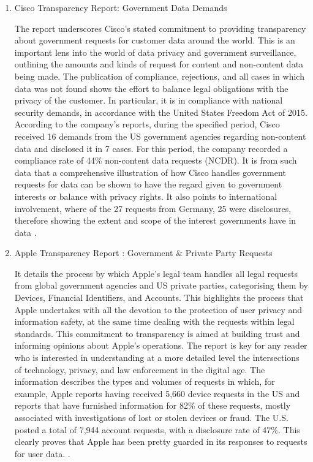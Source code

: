 \begin{enumerate}
 \item Cisco Transparency Report: Government Data Demands 

 The report underscores Cisco's stated commitment to providing transparency about government requests for customer data around the world. This is an important lens into the world of data privacy and government surveillance, outlining the amounts and kinds of request for content and non-content data being made. The publication of compliance, rejections, and all cases in which data was not found shows the effort to balance legal obligations with the privacy of the customer. In particular, it is in compliance with national security demands, in accordance with the United States Freedom Act of 2015. According to the company's reports, during the specified period, Cisco received 16 demands from the US government agencies regarding non-content data and disclosed it in 7 cases. For this period, the company recorded a compliance rate of 44\% non-content data requests (NCDR). It is from such data that a comprehensive illustration of how Cisco handles government requests for data can be shown to have the regard given to government interests or balance with privacy rights. It also points to international involvement, where of the 27 requests from Germany, 25 were disclosures, therefore showing the extent and scope of the interest governments have in data \cite{CiscoTransparencyReport}.

 \item Apple Transparency Report : Government \& Private Party Requests 

It details the process by which Apple's legal team handles all legal requests from global government agencies and US private parties, categorising them by Devices, Financial Identifiers, and Accounts. This highlights the process that Apple undertakes with all the devotion to the protection of user privacy and information safety, at the same time dealing with the requests within legal standards. This commitment to transparency is aimed at building trust and informing opinions about Apple's operations. The report is key for any reader who is interested in understanding at a more detailed level the intersections of technology, privacy, and law enforcement in the digital age. The information describes the types and volumes of requests in which, for example, Apple reports having received 5,660 device requests in the US and reports that have furnished information for 82\% of these requests, mostly associated with investigations of lost or stolen devices or fraud. The U.S. posted a total of 7,944 account requests, with a disclosure rate of 47\%. This clearly proves that Apple has been pretty guarded in its responses to requests for user data. \cite{AppleTransparencyReportGB}.


\end{enumerate}


